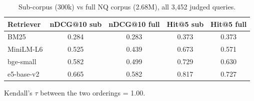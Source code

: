 \begin{table}[t]
\centering
\small
\caption{Sub-corpus (300k) vs full NQ corpus (2.68M), all 3,452 judged queries.}
\label{tab:fullcorpus}
\begin{tabular}{lcccc}
\toprule
Retriever & nDCG@10 sub & nDCG@10 full & Hit@5 sub & Hit@5 full \\
\midrule
BM25 & 0.284 & 0.283 & 0.373 & 0.373 \\
MiniLM-L6 & 0.525 & 0.439 & 0.673 & 0.571 \\
bge-small & 0.582 & 0.499 & 0.729 & 0.630 \\
e5-base-v2 & 0.665 & 0.582 & 0.817 & 0.727 \\
\bottomrule
\end{tabular}
\par\smallskip\parbox{\linewidth}{\footnotesize Kendall's $\tau$ between the two orderings = 1.00.}
\end{table}

